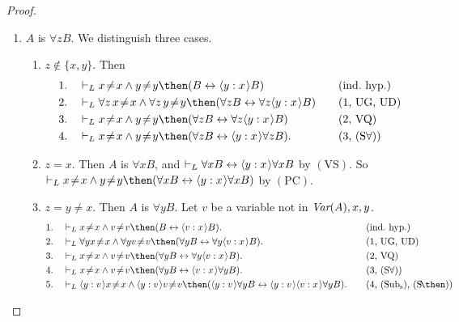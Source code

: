 \documentclass[11pt]{woarticle}
\theoremstyle{break}
\theoremstyle{nonumberplain}
\newcommand{\1}{\;\,|\;\,}
\newcommand{\var}{\emph{Var}}
\renewcommand{\t}[1]{\ensuremath{\langle #1  \makebox[.2ex]{}\rangle}}
\newcommand{\T}[1]{\ensuremath{(\mathrm{ #1})}}
\begin{document}
\begin{proof}
\begin{enumerate}
  \item $A$ is $\forall z B$.\; We distinguish three cases.
    \begin{enumerate}
    \item $z \not\in \{x,y\}$.\; Then
      \begin{alignat*}{2}
        1.\quad& \vdash_L x\!\not=\!x \land y\!\not=\!y \then
        (B \leftrightarrow \t{y:x}B) &\quad&\text{(ind.~hyp.)}\\
        2.\quad& \vdash_L \forall z\, x\!\not=\!x \land \forall z\,
        y\!\not=\!y \then
        (\forall z B \leftrightarrow \forall z \t{y:x}B) &&\text{(1, UG, UD)}\\
        3.\quad& \vdash_L x\!\not=\!x \land y\!\not=\!y \then
        (\forall z B \leftrightarrow \forall z \t{y:x}B) &&\text{(2, VQ)}\\
        4.\quad& \vdash_L x\!\not=\!x \land y\!\not=\!y \then
        (\forall z B \leftrightarrow \t{y:x}\forall z B). 
        &&\text{(3, \T{S\forall})}
      \end{alignat*}
    \item $z=x$.\; Then $A$ is $\forall x B$, and $\vdash_L \forall x
      B \leftrightarrow \t{y:x}\forall x B$ by \T{VS}. So
      $\vdash_L x\!\not=\!x \land y\!\not=\!y \then (\forall x B
      \leftrightarrow \t{y:x}\forall x B)$ by \T{PC}.
    \item $z=y\not=x$.\; Then $A$ is $\forall y B$. Let $v$ be a
      variable not in $\var(A),x,y$.
      \begin{alignat*}{2}
        1.\quad& \vdash_L x\!\not=\!x \land v\!\not=\!v \then
          (B \leftrightarrow \t{v:x}B). &\quad&\text{(ind.~hyp.)}\\
        2.\quad& \vdash_L \forall y x\!\not=\!x \land \forall y
          v\!\not=\!v \then (\forall y B \leftrightarrow \forall y \t{v:x}B).
          &&\text{(1, UG, UD)}\\
        3.\quad& \vdash_L x\!\not=\!x \land v\!\not=\!v \then 
          (\forall y B \leftrightarrow \forall y \t{v:x}B).
          &&\text{(2, VQ)}\\
        4.\quad& \vdash_L x\!\not=\!x \land v\!\not=\!v \then 
          (\forall y B \leftrightarrow \t{v:x}\forall y B).
          &&\text{(3, \T{S\forall})}\\
        5.\quad& \vdash_L \t{y:v}x\!\not=\!x \land \t{y:v}v\!\not=\!v \then 
          (\t{y:v}\forall y B \leftrightarrow \t{y:v}\t{v:x}\forall y B).
          &&\text{(4, \T{Sub_s}, \T{S\!\then})}\\

\end{alignat*}
\end{enumerate}
\end{enumerate}
\end{proof}
\end{document}
